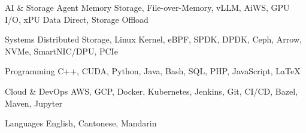 

\begin{cvskills}

  \cvskill
    {AI \& Storage} %
    {Agent Memory Storage, File-over-Memory, vLLM, AiWS, GPU I/O, xPU Data Direct, Storage Offload} %

  \cvskill
    {Systems} %
    {Distributed Storage, Linux Kernel, eBPF, SPDK, DPDK, Ceph, Arrow, NVMe, SmartNIC/DPU, PCIe} %

  \cvskill
    {Programming} %
    {C++, CUDA, Python, Java, Bash, SQL, PHP, JavaScript, LaTeX} %

  \cvskill
    {Cloud \& DevOps} %
    {AWS, GCP, Docker, Kubernetes, Jenkins, Git, CI/CD, Bazel, Maven, Jupyter} %

  \cvskill
    {Languages} %
    {English, Cantonese, Mandarin} %

\end{cvskills}
